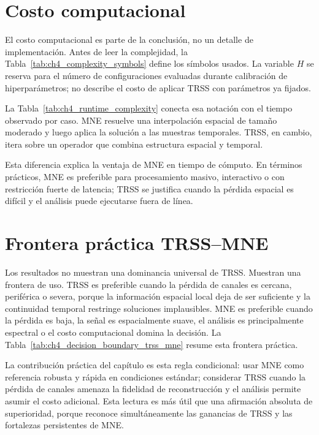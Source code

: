 \FloatBarrier

\section{Costo computacional}
\label{sec:cap4_costo}

El costo computacional es parte de la conclusión, no un detalle de implementación. Antes de leer la complejidad, la Tabla~\ref{tab:ch4_complexity_symbols} define los símbolos usados. La variable $H$ se reserva para el número de configuraciones evaluadas durante calibración de hiperparámetros; no describe el costo de aplicar TRSS con parámetros ya fijados.



La Tabla~\ref{tab:ch4_runtime_complexity} conecta esa notación con el tiempo observado por caso. MNE resuelve una interpolación espacial de tamaño moderado y luego aplica la solución a las muestras temporales. TRSS, en cambio, itera sobre un operador que combina estructura espacial y temporal.



Esta diferencia explica la ventaja de MNE en tiempo de cómputo. En términos prácticos, MNE es preferible para procesamiento masivo, interactivo o con restricción fuerte de latencia; TRSS se justifica cuando la pérdida espacial es difícil y el análisis puede ejecutarse fuera de línea.

\FloatBarrier

\section{Frontera práctica TRSS--MNE}

Los resultados no muestran una dominancia universal de TRSS. Muestran una frontera de uso. TRSS es preferible cuando la pérdida de canales es cercana, periférica o severa, porque la información espacial local deja de ser suficiente y la continuidad temporal restringe soluciones implausibles. MNE es preferible cuando la pérdida es baja, la señal es espacialmente suave, el análisis es principalmente espectral o el costo computacional domina la decisión. La Tabla~\ref{tab:ch4_decision_boundary_trss_mne} resume esta frontera práctica.



La contribución práctica del capítulo es esta regla condicional: usar MNE como referencia robusta y rápida en condiciones estándar; considerar TRSS cuando la pérdida de canales amenaza la fidelidad de reconstrucción y el análisis permite asumir el costo adicional. Esta lectura es más útil que una afirmación absoluta de superioridad, porque reconoce simultáneamente las ganancias de TRSS y las fortalezas persistentes de MNE.
